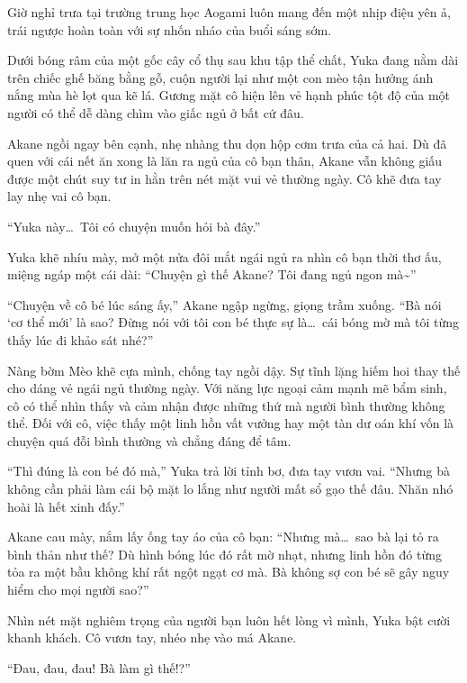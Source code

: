 \documentclass[../main.tex]{subfiles}
\begin{document}
\begin{center}
    \pov{-}
\end{center}

Giờ nghỉ trưa tại trường trung học Aogami luôn mang đến một nhịp điệu yên ả, trái ngược hoàn toàn với sự nhốn nháo của buổi sáng sớm.

Dưới bóng râm của một gốc cây cổ thụ sau khu tập thể chất,  Yuka đang nằm dài trên chiếc ghế băng bằng gỗ, cuộn người lại như một con mèo tận hưởng ánh nắng mùa hè lọt qua kẽ lá. Gương mặt cô hiện lên vẻ hạnh phúc tột độ của một người có thể dễ dàng chìm vào giấc ngủ ở bất cứ đâu.

Akane ngồi ngay bên cạnh, nhẹ nhàng thu dọn hộp cơm trưa của cả hai. Dù đã quen với cái nết ăn xong là lăn ra ngủ của cô bạn thân, Akane vẫn không giấu được một chút suy tư in hằn trên nét mặt vui vẻ thường ngày. Cô khẽ đưa tay lay nhẹ vai cô bạn.

``Yuka này\dots\ Tôi có chuyện muốn hỏi bà đây.''

Yuka khẽ nhíu mày, mở một nửa đôi mắt ngái ngủ ra nhìn cô bạn thời thơ ấu, miệng ngáp một cái dài: ``Chuyện gì thế Akane? Tôi đang ngủ ngon mà\~{}''

``Chuyện về cô bé lúc sáng ấy,'' Akane ngập ngừng, giọng trầm xuống. ``Bà nói `cơ thể mới' là sao? Đừng nói với tôi con bé thực sự là\dots\ cái bóng mờ mà tôi từng thấy lúc đi khảo sát nhé?''

Nàng bờm Mèo khẽ cựa mình, chống tay ngồi dậy. Sự tĩnh lặng hiếm hoi thay thế cho dáng vẻ ngái ngủ thường ngày. Với năng lực ngoại cảm mạnh mẽ bẩm sinh, cô có thể nhìn thấy và cảm nhận được những thứ mà người bình thường không thể. Đối với cô, việc thấy một linh hồn vất vưởng hay một tàn dư oán khí vốn là chuyện quá đỗi bình thường và chẳng đáng để tâm.

``Thì đúng là con bé đó mà,'' Yuka trả lời tỉnh bơ, đưa tay vươn vai. ``Nhưng bà không cần phải làm cái bộ mặt lo lắng như người mất sổ gạo thế đâu. Nhăn nhó hoài là hết xinh đấy.''

Akane cau mày, nắm lấy ống tay áo của cô bạn: ``Nhưng mà\dots\ sao bà lại tỏ ra bình thản như thế? Dù hình bóng lúc đó rất mờ nhạt, nhưng linh hồn đó từng tỏa ra một bầu không khí rất ngột ngạt cơ mà. Bà không sợ con bé sẽ gây nguy hiểm cho mọi người sao?''

Nhìn nét mặt nghiêm trọng của người bạn luôn hết lòng vì mình, Yuka bật cười khanh khách. Cô vươn tay, nhéo nhẹ vào má Akane.

``Đau, đau, đau! Bà làm gì thế!?''
\end{document}
